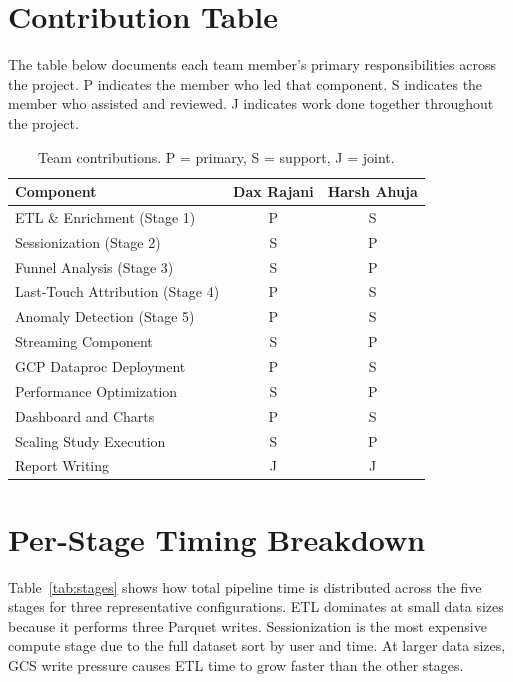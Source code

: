 \documentclass[letterpaper,twocolumn,10pt]{article}
\begin{document}
\appendix
\section{Contribution Table}

The table below documents each team member's primary responsibilities across the
project. P indicates the member who led that component. S indicates the member who
assisted and reviewed. J indicates work done together throughout the project.

\begin{table}[H]
\centering
\small
\caption{Team contributions. P = primary, S = support, J = joint.}
\begin{tabularx}{\columnwidth}{@{}Xcc@{}}
\toprule
Component & Dax Rajani & Harsh Ahuja \\
\midrule
ETL \& Enrichment (Stage 1)         & P & S \\
Sessionization (Stage 2)            & S & P \\
Funnel Analysis (Stage 3)           & S & P \\
Last-Touch Attribution (Stage 4)    & P & S \\
Anomaly Detection (Stage 5)         & P & S \\
Streaming Component                 & S & P \\
GCP Dataproc Deployment             & P & S \\
Performance Optimization            & S & P \\
Dashboard and Charts                & P & S \\
Scaling Study Execution             & S & P \\
Report Writing                      & J & J \\
\bottomrule
\end{tabularx}
\end{table}

\section{Per-Stage Timing Breakdown}

Table~\ref{tab:stages} shows how total pipeline time is distributed across the
five stages for three representative configurations. ETL dominates at small data
sizes because it performs three Parquet writes. Sessionization is the most
expensive compute stage due to the full dataset sort by user and time. At larger
data sizes, GCS write pressure causes ETL time to grow faster than the other stages.
\end{document}
